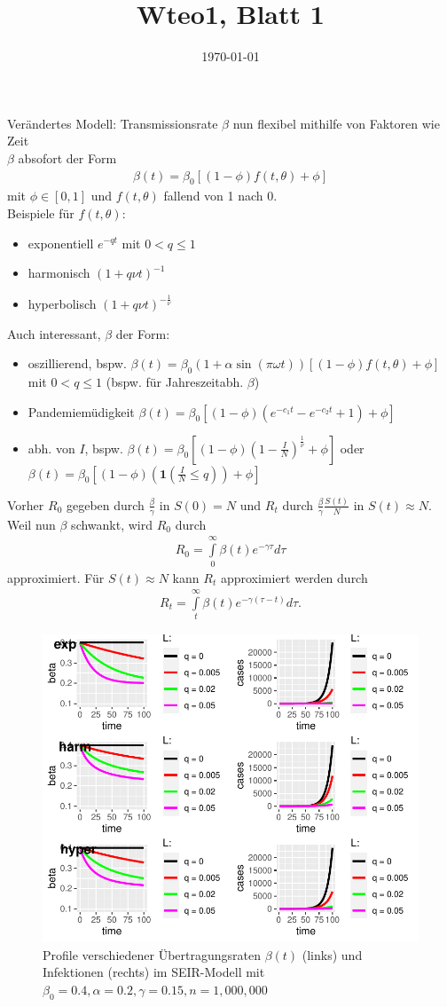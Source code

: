 \documentclass{article}
\title{Wteo1, Blatt 1}
\date{\today}
\begin{document}
Verändertes Modell: Transmissionsrate $\beta$ nun flexibel mithilfe von Faktoren wie Zeit \\
$\beta$ absofort der Form \begin{align*}
\beta(t) = \beta_0 [(1-\phi)f(t, \theta) + \phi]
\end{align*}
mit $\phi \in [0,1]$ und $f(t, \theta)$ fallend von 1 nach 0. \\
Beispiele für $f(t, \theta)$: \begin{itemize}
\item exponentiell $e^{-qt}$ mit $0 < q \leq 1$
\item harmonisch $(1+q\nu t)^{-1}$
\item hyperbolisch $(1+q\nu t)^{-\frac{1}{\nu}}$
\end{itemize}
Auch interessant, $\beta$ der Form: \begin{itemize}
\item oszillierend, bspw. $\beta(t) = \beta_0(1+\alpha\sin(\pi\omega t))[(1-\phi)f(t,\theta)+\phi]$ mit $0 < q \leq 1$ (bspw. für Jahreszeitabh. $\beta$)
\item Pandemiemüdigkeit $\beta(t) = \beta_0[(1-\phi)(e^{-c_1 t} - e^{-c_2 t}+1)+\phi]$
\item abh. von $I$, bspw.  $\beta(t) = \beta_0[(1-\phi)(1-\frac{I}{N})^{\frac{1}{\nu}}+\phi]$ oder $\beta(t) = \beta_0[(1-\phi)(\mathbf{1}(\frac{I}{N}\leq q))+\phi]$ 
\end{itemize}
Vorher $R_0$ gegeben durch $\frac{\beta}{\gamma}$ in $S(0) = N$ und $R_t$ durch $\frac{\beta}{\gamma} \frac{S(t)}{N}$ in $S(t) \approx N$.\\
Weil nun $\beta$ schwankt, wird $R_0$ durch \begin{align*}
R_0 = \int\limits_0^\infty \beta(t) e^{-\gamma \tau} d\tau
\end{align*}
approximiert. Für $S(t) \approx N$ kann $R_t$ approximiert werden durch
\begin{align*}
R_t = \int\limits_t^\infty \beta(t) e^{-\gamma (\tau-t)} d\tau.
\end{align*}
\begin{figure}[ht]
	\centering
  \includegraphics{beta_plot}
	\caption{Profile verschiedener Übertragungsraten $\beta(t)$ (links) und Infektionen (rechts) im SEIR-Modell mit $\beta_0 = 0.4, \alpha = 0.2, \gamma = 0.15, n = 1,000,000$}
	\label{fig2}
\end{figure}
\end{document}
